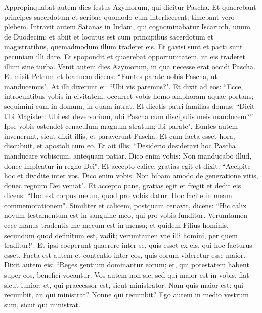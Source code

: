 \begin{biblechapter}  
\verse Appropinquabat autem dies festus Azymorum, qui dicitur Pascha. 
\verse Et quaerebant principes sacerdotum et scribae quomodo eum interficerent; timebant vero plebem. 
\verse Intravit autem Satanas in Iudam, qui cognominabatur Iscarioth, unum de Duodecim; 
\verse et abiit et locutus est cum principibus sacerdotum et magistratibus, quemadmodum illum traderet eis. 
\verse Et gavisi sunt et pacti sunt pecuniam illi dare. 
\verse Et spopondit et quaerebat opportunitatem, ut eis traderet illum sine turba. 
\verse Venit autem dies Azymorum, in qua necesse erat occidi Pascha. 
\verse Et misit Petrum et Ioannem dicens: “Euntes parate nobis Pascha, ut manducemus". 
\verse At illi dixerunt ei: “Ubi vis paremus?". 
\verse Et dixit ad eos: “Ecce, introeuntibus vobis in civitatem, occurret vobis homo amphoram aquae portans; sequimini eum in domum, in quam intrat. 
\verse Et dicetis patri familias domus: “Dicit tibi Magister: Ubi est deversorium, ubi Pascha cum discipulis meis manducem?”. 
\verse Ipse vobis ostendet cenaculum magnum stratum; ibi parate". 
\verse Euntes autem invenerunt, sicut dixit illis, et paraverunt Pascha. 
\verse Et cum facta esset hora, discubuit, et apostoli cum eo. 
\verse Et ait illis: “Desiderio desideravi hoc Pascha manducare vobiscum, antequam patiar. 
\verse Dico enim vobis: Non manducabo illud, donec impleatur in regno Dei". 
\verse Et accepto calice, gratias egit et dixit: “Accipite hoc et dividite inter vos.  
\verse Dico enim vobis: Non bibam amodo de generatione vitis, donec regnum Dei veniat". 
\verse Et accepto pane, gratias egit et fregit et dedit eis dicens: “Hoc est corpus meum, quod pro vobis datur. Hoc facite in meam commemorationem". 
\verse Similiter et calicem, postquam cenavit, dicens: “Hic calix novum testamentum est in sanguine meo, qui pro vobis funditur. 
\verse Verumtamen ecce manus tradentis me mecum est in mensa; 
\verse et quidem Filius hominis, secundum quod definitum est, vadit; verumtamen vae illi homini, per quem traditur!". 
\verse Et ipsi coeperunt quaerere inter se, quis esset ex eis, qui hoc facturus esset. 
\verse Facta est autem et contentio inter eos, quis eorum videretur esse maior.  
\verse Dixit autem eis: “Reges gentium dominantur eorum; et, qui potestatem habent super eos, benefici vocantur. 
\verse Vos autem non sic, sed qui maior est in vobis, fiat sicut iunior; et, qui praecessor est, sicut ministrator. 
\verse Nam quis maior est: qui recumbit, an qui ministrat? Nonne qui recumbit? Ego autem in medio vestrum sum, sicut qui ministrat. 

\end{biblechapter}

